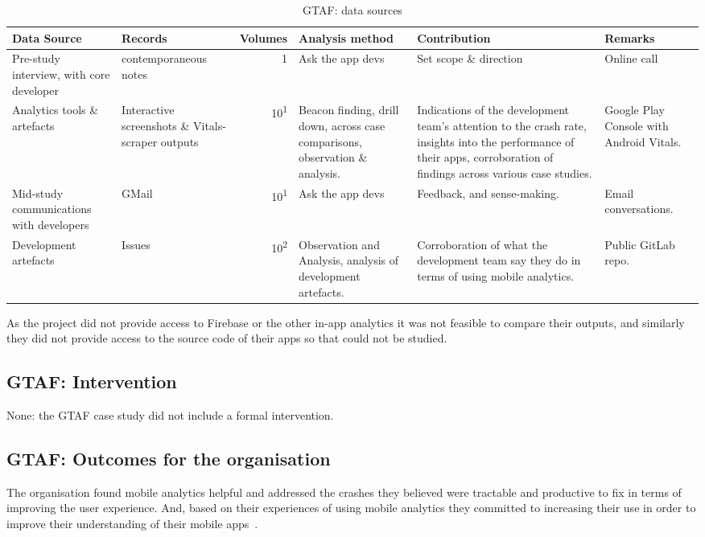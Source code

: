 \begin{table}
    \centering
    \footnotesize
    \tabcolsep=0.12cm
    \begin{tabular}{p{2.4cm}p{2.4cm}r>{\raggedright}p{2.4cm}>{\raggedright}p{3cm}>{\raggedright\arraybackslash}p{2.5cm}}
        Data Source & Records & Volumes & Analysis method &Contribution & Remarks \\
        \toprule
         Pre-study interview, with core developer & contemporaneous notes\footnotemark & 1 & Ask the app devs & Set scope \& direction & Online call \\
         Analytics tools \& artefacts &Interactive screenshots \& Vitals-scraper outputs &10\textsuperscript{1} & Beacon finding, drill down, across case comparisons, observation \& analysis. & Indications of the development team's attention to the crash rate, insights into the performance of their apps, corroboration of findings across various case studies. & Google Play Console with Android Vitals. \\         
         Mid-study communications with developers & GMail & 10\textsuperscript{1} & Ask the app devs & Feedback, and sense-making.  & Email conversations. \\
         Development artefacts  & Issues & 10\textsuperscript{2} & Observation and Analysis, analysis of development artefacts. & Corroboration of what the development team say they do in terms of using mobile analytics. & Public GitLab repo. \\
         \bottomrule
    \end{tabular}
    \caption{GTAF: data sources}
    \label{tab:gtaf-data-sources}
\end{table}



As the project did not provide access to Firebase or the other in-app analytics it was not feasible to compare their outputs, and similarly they did not provide access to the source code of their apps so that could not be studied.

\subsection{GTAF: Intervention}
None: the GTAF case study did not include a formal intervention.

\subsection{GTAF: Outcomes for the organisation}
The organisation found mobile analytics helpful and addressed the crashes they believed were tractable and productive to fix in terms of improving the user experience. And, based on their experiences of using mobile analytics they committed to increasing their use in order to improve their understanding of their mobile apps~\citep{gtafblog2021_gtaf_accomplishment_2020}.


